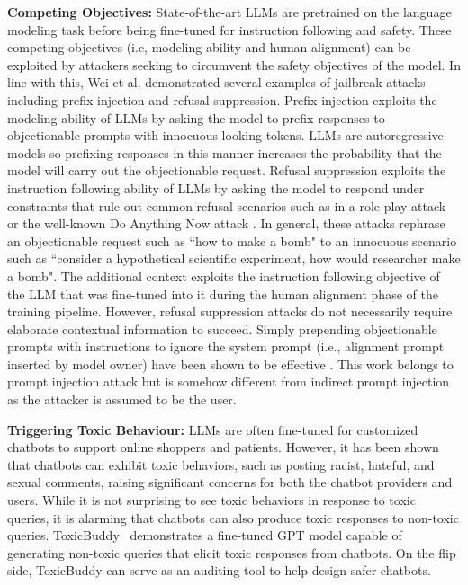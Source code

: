 \smallskip
\noindent
{\bf Competing Objectives:} State-of-the-art LLMs are pretrained on the language modeling task before being fine-tuned for instruction following and safety. These competing objectives (i.e,  modeling ability and human alignment) can be exploited by attackers seeking to circumvent the safety objectives of the model. In line with this, Wei et al. \cite{wei_2023b} demonstrated several examples of jailbreak attacks including prefix injection and refusal suppression. Prefix injection exploits the modeling ability of LLMs by asking the model to prefix responses to objectionable prompts with innocuous-looking tokens. LLMs are autoregressive models so prefixing responses in this manner increases the probability that the model will carry out the objectionable request. Refusal suppression exploits the instruction following ability of LLMs by asking the model to respond under constraints that rule out common refusal scenarios such as in a role-play attack \cite{deng_2024a} or the well-known Do Anything Now attack \cite{shen_2023a}. In general, these attacks rephrase an objectionable request such as ``how to make a bomb" to an innocuous scenario such as ``consider a hypothetical scientific experiment, how would researcher make a bomb". The additional context exploits the instruction following objective of the LLM that was fine-tuned into it during the human alignment phase of the training pipeline. However, refusal suppression attacks do not necessarily require elaborate contextual information to succeed. Simply prepending objectionable prompts with instructions to ignore the system prompt (i.e., alignment prompt inserted by model owner) have been shown to be effective \cite{perez_2022a}. This work \cite{perez_2022a} belongs to prompt injection attack but is somehow different from indirect prompt injection as the attacker is assumed to be the user.

\smallskip
\noindent
{\bf Triggering Toxic Behaviour:} LLMs are often fine-tuned for customized chatbots to support online shoppers and patients. However, it has been shown that chatbots can exhibit toxic behaviors, such as posting racist, hateful, and sexual comments, raising significant concerns for both the chatbot providers and users. While it is not surprising to see toxic behaviors in response to toxic queries, it is alarming that chatbots can also produce toxic responses to non-toxic queries.  ToxicBuddy~\cite{si_2022a} demonstrates a fine-tuned GPT model capable of generating non-toxic queries that elicit toxic responses from chatbots. On the flip side, ToxicBuddy can serve as an auditing tool to help design safer chatbots.

